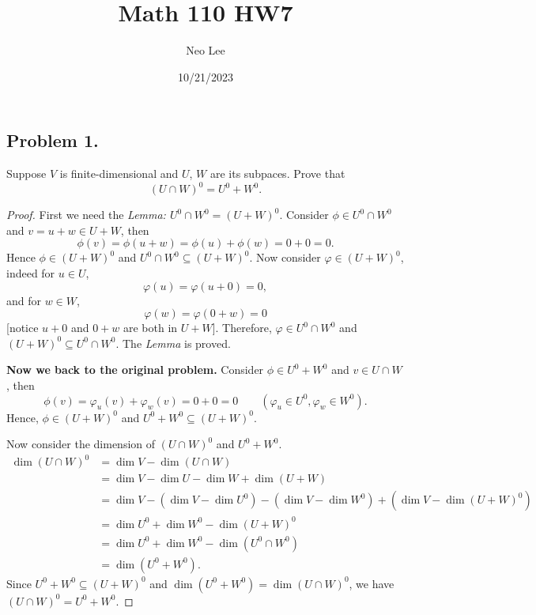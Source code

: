 \documentclass{article}
\title{Math 110 HW7}
\author{Neo Lee}
\date{10/21/2023}
\begin{document}
 

\maketitle 

\subsection*{Problem 1.}
Suppose $V$ is finite-dimensional and $U$, $W$ are its subpaces. Prove that
$$ (U\cap W)^0 = U^0 + W^0.$$
\begin{proof}
    First we need the \emph{Lemma: $U^0 \cap W^0 = (U+W)^0$}.
    Consider $\phi \in U^0\cap W^0$ and $v = u+w \in U+W$, then 
    $$\phi(v) = \phi(u+w) = \phi(u) + \phi(w) = 0 + 0 = 0.$$
    Hence $\phi \in (U+W)^0$ and $U^0\cap W^0\subseteq (U+W)^0$.
    Now consider $\varphi \in (U+W)^0$, indeed for $u\in U$, $$\varphi(u) = \varphi(u+0) = 0,$$ and 
    for $w\in W$, $$\varphi(w) = \varphi(0+w) = 0$$ [notice $u+0$ and $0+w$ are both in $U+W$].
    Therefore, $\varphi \in U^0 \cap W^0$ and $(U+W)^0\subseteq U^0\cap W^0$. The \emph{Lemma} is 
    proved.

    \textbf{Now we back to the original problem.} Consider $\phi \in U^0+W^0$ and $v \in U\cap W$, then 
    $$\phi(v) = \varphi_u(v) + \varphi_w(v) =0+0=0 \qquad (\varphi_u\in U^0, \varphi_w\in W^0).$$
    Hence, $\phi\in (U+W)^0$ and $U^0+W^0\subseteq (U+W)^0$.

    Now consider the dimension of $(U\cap W)^0$ and $U^0 + W^0$.
    \begin{align*}
        \dim (U\cap W)^0 &= \dim V - \dim (U\cap W) \\
        &= \dim V - \dim U - \dim W + \dim (U+W) \\
        &= \dim V - (\dim V - \dim U^0) - (\dim V - \dim W^0) + (\dim V - \dim (U+W)^0) \\
        &= \dim U^0 + \dim W^0 - \dim (U+W)^0 \\
        &= \dim U^0 + \dim W^0 - \dim (U^0\cap W^0) \\
        &= \dim (U^0 + W^0).
    \end{align*}
    Since $U^0+W^0\subseteq (U+W)^0$ and $\dim (U^0 + W^0)=\dim (U\cap W)^0$, we have 
    $(U\cap W)^0 = U^0 + W^0$.
\end{proof}

\newpage
\end{document}
